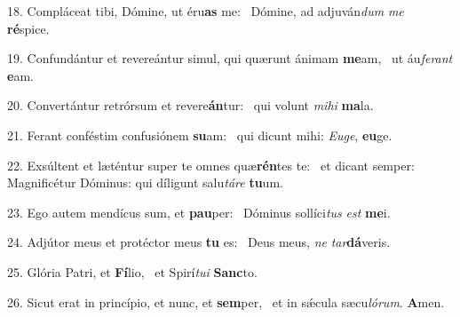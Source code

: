 18. Compláceat tibi, Dómine, ut éru\textbf{as} me: \ast\  Dómine, ad adjuván\textit{dum} \textit{me} \textbf{ré}spice.\

19. Confundántur et revereántur simul, qui quærunt ánimam \textbf{me}am, \ast\  ut áu\textit{fe}\textit{rant} \textbf{e}am.\

20. Convertántur retrórsum et revere\textbf{án}tur: \ast\  qui volunt \textit{mi}\textit{hi} \textbf{ma}la.\

21. Ferant conféstim confusiónem \textbf{su}am: \ast\  qui dicunt mihi: \textit{Eu}\textit{ge}, \textbf{eu}ge.\

22. Exsúltent et læténtur super te omnes quæ\textbf{rén}tes te: \ast\  et dicant semper: Magnificétur Dóminus: qui díligunt salu\textit{tá}\textit{re} \textbf{tu}um.\

23. Ego autem mendícus sum, et \textbf{pau}per: \ast\  Dóminus sollíci\textit{tus} \textit{est} \textbf{me}i.\

24. Adjútor meus et protéctor meus \textbf{tu} es: \ast\  Deus meus, \textit{ne} \textit{tar}\textbf{dá}veris.\

25. Glória Patri, et \textbf{Fí}lio, \ast\  et Spirí\textit{tu}\textit{i} \textbf{Sanc}to.\

26. Sicut erat in princípio, et nunc, et \textbf{sem}per, \ast\  et in sǽcula sæcu\textit{ló}\textit{rum}. \textbf{A}men.\


